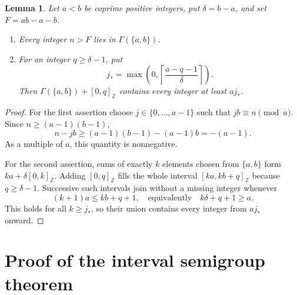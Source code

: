 \documentclass[11pt]{article}
\newtheorem{lemma}[theorem]{Lemma}
\theoremstyle{definition}
\theoremstyle{remark}
\newcommand{\ZZ}{\mathbb Z}
\newcommand{\iv}[2]{[#1,#2]_{\ZZ}}
\newcommand{\Ga}{\Gamma}
\begin{document}
\begin{lemma}\label{lem:pair}
Let $a<b$ be coprime positive integers, put $\delta=b-a$, and set
$F=ab-a-b$.
\begin{enumerate}
 \item Every integer $n>F$ lies in $\Ga(\{a,b\})$.
 \item For an integer $q\geq\delta-1$, put
 \[
 j_* =\max\left(0,\left\lceil\frac{a-q-1}{\delta}\right\rceil\right).
 \]
 Then $\Ga(\{a,b\})+\iv{0}{q}$ contains every integer at least $aj_*$.
\end{enumerate}
\end{lemma}

\begin{proof}
For the first assertion choose $j\in\{0,\ldots,a-1\}$ such that
$jb\equiv n\pmod a$. Since $n\geq(a-1)(b-1)$,
\[
 n-jb\geq(a-1)(b-1)-(a-1)b=-(a-1).
\]
As a multiple of $a$, this quantity is nonnegative.

For the second assertion, sums of exactly $k$ elements chosen from
$\{a,b\}$ form $ka+\delta\iv{0}{k}$. Adding $\iv{0}{q}$ fills
the whole interval $\iv{ka}{kb+q}$ because $q\geq\delta-1$.
Successive such intervals join without a missing integer whenever
\[
 (k+1)a\leq kb+q+1,
 \quad\text{equivalently}\quad k\delta+q+1\geq a.
\]
This holds for all $k\geq j_*$, so their union contains every integer
from $aj_*$ onward.
\end{proof}

\section{Proof of the interval semigroup theorem}
\end{document}
